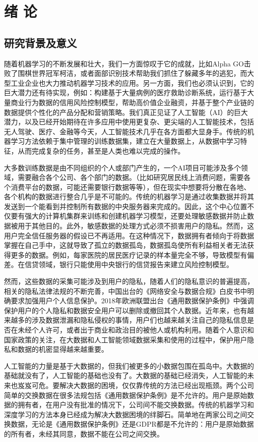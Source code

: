 \chapter{绪\hskip 0.4cm 论}
\label{ch1}

\section{研究背景及意义}
随着机器学习的不断发展和壮大，我们一方面惊叹于它的成就，比如Alpha GO击败了围棋世界冠军柯洁，或者面部识别技术帮助我们抓住了躲藏多年的逃犯，而大型工业企业也大力推动机器学习技术的应用。另一方面，我们也必须认识到，它的巨大潜力还有待实现，例如：构建基于大量病例的医疗救助诊断系统，运行基于大量商业行为数据的信用风险控制模型，帮助高价值企业融资，并基于整个产业链的数据提供个性化的产品分配和营销策略。我们真正见证了人工智能（AI）的巨大潜力，以及已经开始期待在许多应用中使用更复杂、更尖端的人工智能技术，包括无人驾驶、医疗、金融等今天，人工智能技术几乎在各方面都大显身手。传统的机器学习方法依赖于集中管理的训练数据集，建立在大量数据上，从数据中学习特征，从而完成复杂的任务，甚至是人类也难以完成的操作。

大多数训练数据是由不同组织的个人或部门产生的，一个AI项目可能涉及多个领域，需要融合各个公司、各个部门的数据。（比如研究居民线上消费问题，需要各个消费平台的数据，可能还需要银行数据等等），但在现实中想要将分散在各地、各个机构的数据进行整合几乎是不可能的。传统的机器学习是通过收集数据并将其发送到一个能看到并控制所有数据的中央服务器来完成的。因此，这个中心位置不仅要有强大的计算机集群来训练和创建机器学习模型，还要处理敏感数据并防止数据被用于其他目的。此外，敏感数据的处理方式必须不损害用户的隐私。然而，这用户完全信任服务器的假设已不再适用。在这种情况下，数据拥有者倾向于将数据掌握在自己手中，这就导致了孤立的数据孤岛，数据孤岛\cite{ref1}使所有利益相关者无法获得更多的数据。例如，每家医院的居民医疗记录的样本量完全不够，导致模型有偏差。在信贷领域，银行只能使用中央银行的信贷报告来建立风险控制模型。

然而，这些数据的采集可能涉及到用户的隐私，随着人们的隐私意识的普遍提高，相关的隐私法律法规的不断完善，中国出台的《网络安全与数据合规》白皮书中明确要求加强用户个人信息保护。2018年欧洲联盟出台《通用数据保护条例》中强调保护用户的个人隐私和数据安全用户可以删除或撤回其个人数据。近年来，也有越来越多的涉及数据泄漏和隐私侵权的事情，用户们也越来越关注自己的隐私信息是否在未经个人许可，或者出于商业和政治目的被他人或机构利用。随着个人意识和国家政策的关注，在大数据和人工智能领域数据采集和使用的过程中，保护用户隐私和数据的机密显得越来越重要。

人工智能的力量是基于大数据的，但我们被更多的小数据包围在孤岛中。大数据的基础就没有了，人工智能的基础也没有了。大数据的基础已经消失，人工智能的未来也岌岌可危。要解决大数据的困境，仅仅靠传统的方法已经出现瓶颈。两个公司简单的交换数据在很多法规包括《通用数据保护条例》是不允许的。用户是原始数据的拥有者，在用户没有批准的情况下，公司间不能交换数据。传统的机器学习和深度学习的方法本身已经成为解决大数据困境的绊脚石。简单地在两家公司之间交换数据，无论是《通用数据保护条例》还是GDPR\cite{ref2}都是不允许的：用户是原始数据的所有者，未经其同意，数据不能在公司之间交换。


